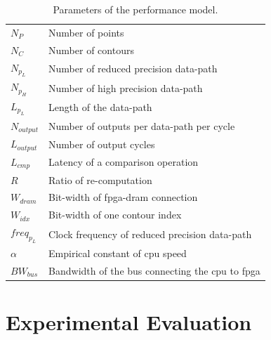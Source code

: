 \begin{table}[t!]
	\begin{spacing}{1.0}
	\caption{Parameters of the performance model.}
	\label{tab:model}
	\centering
	\smallskip
	\begin{tabular}{l|l}
			\hline
			$N_P$			& Number of points \\
			$N_C$			& Number of contours \\
			$N_{p_L}$ 		& Number of reduced precision data-path \\
			$N_{p_H}$ 		& Number of high precision data-path \\
			$L_{p_L}$			& Length of the data-path \\
			$N_{output}$ 	& Number of outputs per data-path per cycle \\
			$L_{output}$ 	& Number of output cycles \\
			$L_{cmp}$			& Latency of a comparison operation \\
			$R$ 			& Ratio of re-computation \\
			$W_{dram}$ 		& Bit-width of \gls{fpga}-\gls{dram} connection \\
			$W_{idx}$ 		& Bit-width of one contour index \\
			$freq_{p_L}$  	& Clock frequency of reduced precision data-path \\
			$\alpha$ 		& Empirical constant of \gls{cpu} speed \\
			$BW_{bus}$ 	& Bandwidth of the bus connecting the \gls{cpu} to \gls{fpga} \\
			\hline
		\end{tabular}
	\end{spacing}
\end{table}

%


\section{Experimental Evaluation}
\label{sec:precision_evaluation}

